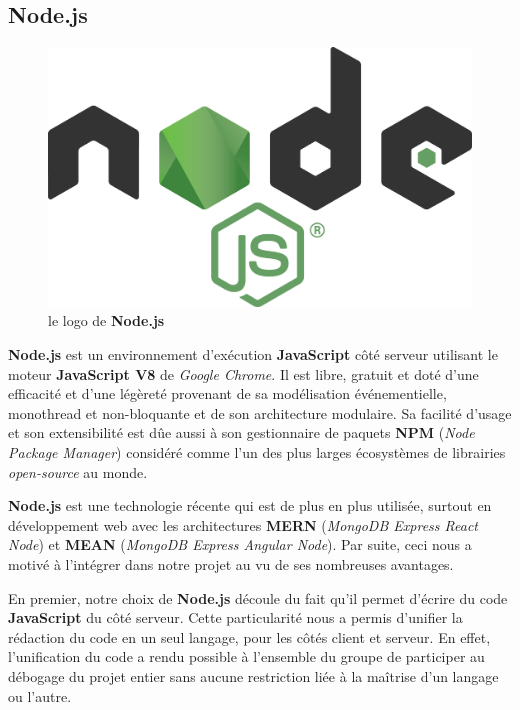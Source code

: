 \documentclass[a4paper,12pt]{report}
\theoremstyle{break}
\theoremstyle{break}
\theoremstyle{break}
\theoremstyle{break}
\theoremstyle{definition}
\theoremstyle{remark}
\begin{document}
\subsection{Node.js}
\begin{figure}[!ht]
  \centering
  \includegraphics[scale=0.04]{images/nodejs_icon.png}
  \caption{le logo de \textbf{Node.js}}
\end{figure}

\textbf{Node.js} est un environnement d'exécution \textbf{JavaScript} côté serveur utilisant le moteur \textbf{JavaScript V8} de \textit{Google Chrome}. Il est libre, gratuit et doté d'une efficacité et d'une légèreté provenant de sa modélisation événementielle, monothread et non-bloquante et de son architecture modulaire. Sa facilité d'usage et son extensibilité est dûe aussi à son gestionnaire de paquets \textbf{NPM} (\textit{Node Package Manager}) considéré comme l'un des plus larges écosystèmes de librairies \textit{open-source} au monde.

\textbf{Node.js} est une technologie récente qui est de plus en plus utilisée, surtout en développement web avec les architectures \textbf{MERN} (\textit{MongoDB Express React Node}) et \textbf{MEAN} (\textit{MongoDB Express Angular Node}). Par suite, ceci nous a motivé à l'intégrer dans notre projet au vu de ses nombreuses avantages.

En premier, notre choix de \textbf{Node.js} découle du fait qu'il permet d'écrire du code \textbf{JavaScript} du côté serveur. Cette particularité nous a permis d'unifier la rédaction du code en un seul langage, pour les côtés client et serveur. En effet, l'unification du code a rendu possible à l'ensemble du groupe de participer au débogage du projet entier sans aucune restriction liée à la maîtrise d'un langage ou l'autre.
\end{document}
